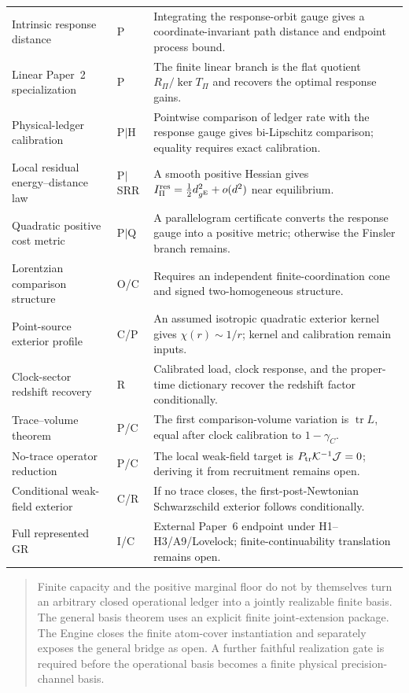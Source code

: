 \documentclass[11pt]{article}
\theoremstyle{remark}
\newcommand{\Status}[1]{\textsf{#1}}
\newcommand{\Ptr}{P_{\rm tr}}
\begin{document}
\begin{longtable}{p{}p{}p{}}
Intrinsic response distance & \Status{P} & Integrating the response-orbit gauge gives a coordinate-invariant path distance and endpoint process bound. \\
Linear Paper~2 specialization & \Status{P} & The finite linear branch is the flat quotient $R_\Pi/\ker T_\Pi$ and recovers the optimal response gains. \\
Physical-ledger calibration & \Status{P$\mid$H} & Pointwise comparison of ledger rate with the response gauge gives bi-Lipschitz comparison; equality requires exact calibration. \\
Local residual energy--distance law & \Status{P$\mid$SRR} & A smooth positive Hessian gives $I_\Pi^{\rm res}=\tfrac12 d_{g^{\rm E}}^2+o(d^2)$ near equilibrium. \\
Quadratic positive cost metric & \Status{P$\mid$Q} & A parallelogram certificate converts the response gauge into a positive metric; otherwise the Finsler branch remains. \\
Lorentzian comparison structure & \Status{O/C} & Requires an independent finite-coordination cone and signed two-homogeneous structure. \\
Point-source exterior profile & \Status{C/P} & An assumed isotropic quadratic exterior kernel gives $\chi(r)\sim1/r$; kernel and calibration remain inputs. \\
Clock-sector redshift recovery & \Status{R} & Calibrated load, clock response, and the proper-time dictionary recover the redshift factor conditionally. \\
Trace--volume theorem & \Status{P/C} & The first comparison-volume variation is $\operatorname{tr}L$, equal after clock calibration to $1-\gamma_C$. \\
No-trace operator reduction & \Status{P/C} & The local weak-field target is $\Ptr\mathcal K^{-1}\mathcal J=0$; deriving it from recruitment remains open. \\
Conditional weak-field exterior & \Status{C/R} & If no trace closes, the first-post-Newtonian Schwarzschild exterior follows conditionally. \\
Full represented GR & \Status{I/C} & External Paper~6 endpoint under H1--H3/A9/Lovelock; finite-continuability translation remains open. \\
\bottomrule
\end{longtable}

\begin{quote}
Finite capacity and the positive marginal floor do not by themselves turn an arbitrary closed operational ledger into a jointly realizable finite basis. The general basis theorem uses an explicit finite joint-extension package. The Engine closes the finite atom-cover instantiation and separately exposes the general bridge as open. A further faithful realization gate is required before the operational basis becomes a finite physical precision-channel basis.
\end{quote}
\end{document}
